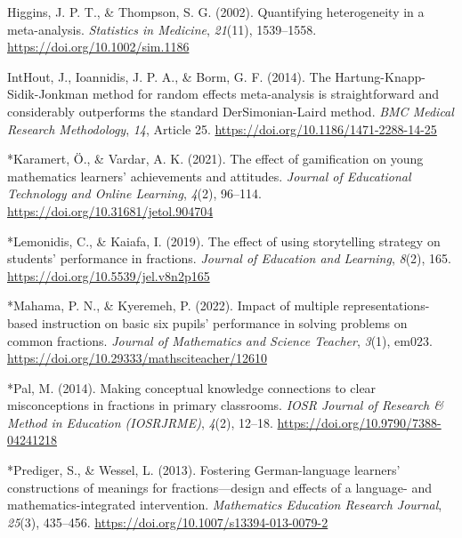 \documentclass[man,a4paper,12pt,floatsintext,nolmodern,notab]{apa7}
\begin{document}
\par\noindent\hangindent=0.5in Higgins, J. P. T., \& Thompson, S. G. (2002). Quantifying heterogeneity in a meta-analysis. \textit{Statistics in Medicine}, \textit{21}(11), 1539–1558. \url{https://doi.org/10.1002/sim.1186}\par
\par\noindent\hangindent=0.5in IntHout, J., Ioannidis, J. P. A., \& Borm, G. F. (2014). The Hartung-Knapp-Sidik-Jonkman method for random effects meta-analysis is straightforward and considerably outperforms the standard DerSimonian-Laird method. \textit{BMC Medical Research Methodology}, \textit{14}, Article 25. \url{https://doi.org/10.1186/1471-2288-14-25}\par
\par\noindent\hangindent=0.5in *Karamert, Ö., \& Vardar, A. K. (2021). The effect of gamification on young mathematics learners’ achievements and attitudes. \textit{Journal of Educational Technology and Online Learning}, \textit{4}(2), 96–114. \url{https://doi.org/10.31681/jetol.904704}\par
\par\noindent\hangindent=0.5in *Lemonidis, C., \& Kaiafa, I. (2019). The effect of using storytelling strategy on students’ performance in fractions. \textit{Journal of Education and Learning}, \textit{8}(2), 165. \url{https://doi.org/10.5539/jel.v8n2p165}\par
\par\noindent\hangindent=0.5in *Mahama, P. N., \& Kyeremeh, P. (2022). Impact of multiple representations-based instruction on basic six pupils’ performance in solving problems on common fractions. \textit{Journal of Mathematics and Science Teacher}, \textit{3}(1), em023. \url{https://doi.org/10.29333/mathsciteacher/12610}\par
\par\noindent\hangindent=0.5in *Pal, M. (2014). Making conceptual knowledge connections to clear misconceptions in fractions in primary classrooms. \textit{IOSR Journal of Research \& Method in Education (IOSRJRME)}, \textit{4}(2), 12–18. \url{https://doi.org/10.9790/7388-04241218}\par
\par\noindent\hangindent=0.5in *Prediger, S., \& Wessel, L. (2013). Fostering German-language learners’ constructions of meanings for fractions—design and effects of a language- and mathematics-integrated intervention. \textit{Mathematics Education Research Journal}, \textit{25}(3), 435–456. \url{https://doi.org/10.1007/s13394-013-0079-2}\par
\end{document}
